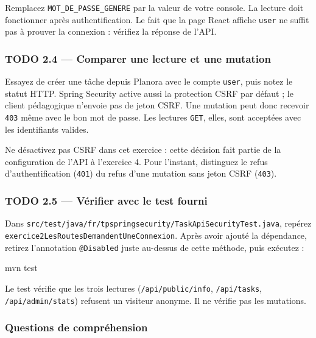 \documentclass[
  french,
  10pt,
  a4paper,
]{article}
\newenvironment{Shaded}{}{}
\newcommand{\ExtensionTok}[1]{#1}
\newcommand{\NormalTok}[1]{#1}
\begin{document}
Remplacez \texttt{MOT\_DE\_PASSE\_GENERE} par la valeur de votre
console. La lecture doit fonctionner après authentification. Le fait que
la page React affiche \texttt{user} ne suffit pas à prouver la connexion
: vérifiez la réponse de l'API.

\subsubsection{TODO 2.4 --- Comparer une lecture et une
mutation}\label{todo-2.4-comparer-une-lecture-et-une-mutation}

Essayez de créer une tâche depuis Planora avec le compte \texttt{user},
puis notez le statut HTTP. Spring Security active aussi la protection
CSRF par défaut ; le client pédagogique n'envoie pas de jeton CSRF. Une
mutation peut donc recevoir \texttt{403} même avec le bon mot de passe.
Les lectures \texttt{GET}, elles, sont acceptées avec les identifiants
valides.

Ne désactivez pas CSRF dans cet exercice : cette décision fait partie de
la configuration de l'API à l'exercice 4. Pour l'instant, distinguez le
refus d'authentification (\texttt{401}) du refus d'une mutation sans
jeton CSRF (\texttt{403}).

\subsubsection{TODO 2.5 --- Vérifier avec le test
fourni}\label{todo-2.5-vuxe9rifier-avec-le-test-fourni}

Dans
\texttt{src/test/java/fr/tpspringsecurity/TaskApiSecurityTest.java},
repérez \texttt{exercice2LesRoutesDemandentUneConnexion}. Après avoir
ajouté la dépendance, retirez l'annotation \texttt{@Disabled} juste
au-dessus de cette méthode, puis exécutez :

\begin{Shaded}
\begin{Highlighting}[]
\ExtensionTok{mvn}\NormalTok{ test}
\end{Highlighting}
\end{Shaded}

Le test vérifie que les trois lectures (\texttt{/api/public/info},
\texttt{/api/tasks}, \texttt{/api/admin/stats}) refusent un visiteur
anonyme. Il ne vérifie pas les mutations.

\subsubsection{Questions de
compréhension}\label{questions-de-compruxe9hension}
\end{document}
